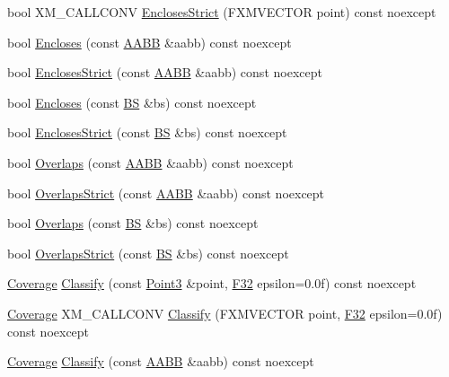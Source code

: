 \begin{DoxyCompactItemize}
\item 
bool X\+M\+\_\+\+C\+A\+L\+L\+C\+O\+NV \hyperlink{classmage_1_1_a_a_b_b_aa8946038ce497c79fa0ee34e87aa9aed}{Encloses\+Strict} (F\+X\+M\+V\+E\+C\+T\+OR point) const noexcept
\item 
bool \hyperlink{classmage_1_1_a_a_b_b_a06f017756a593461127613e4d77d0944}{Encloses} (const \hyperlink{classmage_1_1_a_a_b_b}{A\+A\+BB} \&aabb) const noexcept
\item 
bool \hyperlink{classmage_1_1_a_a_b_b_af037df0800e1e8c3564363f154c2424a}{Encloses\+Strict} (const \hyperlink{classmage_1_1_a_a_b_b}{A\+A\+BB} \&aabb) const noexcept
\item 
bool \hyperlink{classmage_1_1_a_a_b_b_ab906cfa784000d7fd49e9a405825e72f}{Encloses} (const \hyperlink{classmage_1_1_b_s}{BS} \&bs) const noexcept
\item 
bool \hyperlink{classmage_1_1_a_a_b_b_af7c0070023a2b7d3b724cd4077782fb0}{Encloses\+Strict} (const \hyperlink{classmage_1_1_b_s}{BS} \&bs) const noexcept
\item 
bool \hyperlink{classmage_1_1_a_a_b_b_a0953268725119ef25651ab50ad3de658}{Overlaps} (const \hyperlink{classmage_1_1_a_a_b_b}{A\+A\+BB} \&aabb) const noexcept
\item 
bool \hyperlink{classmage_1_1_a_a_b_b_a00628d5ed2bf73021bbb3cdf94049580}{Overlaps\+Strict} (const \hyperlink{classmage_1_1_a_a_b_b}{A\+A\+BB} \&aabb) const noexcept
\item 
bool \hyperlink{classmage_1_1_a_a_b_b_ac105ff686890e3fbb36bb230c663bde9}{Overlaps} (const \hyperlink{classmage_1_1_b_s}{BS} \&bs) const noexcept
\item 
bool \hyperlink{classmage_1_1_a_a_b_b_ac2f7270ec51acb91aed4965f135a53a9}{Overlaps\+Strict} (const \hyperlink{classmage_1_1_b_s}{BS} \&bs) const noexcept
\item 
\hyperlink{namespacemage_aa9fe157e5a578a103160266df8cccb0a}{Coverage} \hyperlink{classmage_1_1_a_a_b_b_a4397eb9619f0c414dcb11819196784ed}{Classify} (const \hyperlink{structmage_1_1_point3}{Point3} \&point, \hyperlink{namespacemage_aa97e833b45f06d60a0a9c4fc22ae02c0}{F32} epsilon=0.\+0f) const noexcept
\item 
\hyperlink{namespacemage_aa9fe157e5a578a103160266df8cccb0a}{Coverage} X\+M\+\_\+\+C\+A\+L\+L\+C\+O\+NV \hyperlink{classmage_1_1_a_a_b_b_adb9b0a7b1aed99aa86708a84c5937859}{Classify} (F\+X\+M\+V\+E\+C\+T\+OR point, \hyperlink{namespacemage_aa97e833b45f06d60a0a9c4fc22ae02c0}{F32} epsilon=0.\+0f) const noexcept
\item 
\hyperlink{namespacemage_aa9fe157e5a578a103160266df8cccb0a}{Coverage} \hyperlink{classmage_1_1_a_a_b_b_a835279b552703bd72fa19856ad27cbd7}{Classify} (const \hyperlink{classmage_1_1_a_a_b_b}{A\+A\+BB} \&aabb) const noexcept

\end{DoxyCompactItemize}
